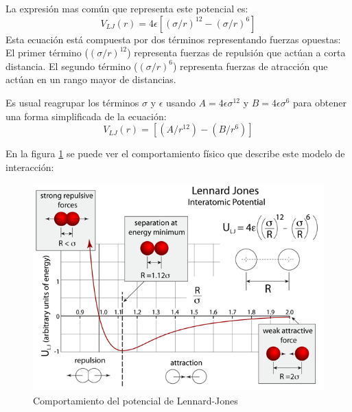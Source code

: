 La expresión mas común que representa este potencial es: 
\begingroup
\fontsize{14pt}{5pt}
\begin{equation} V_{LJ}(r)= 4 \epsilon [ (\sigma/r)^{12} - (\sigma/r)^6] \end{equation}
\endgroup
Esta ecuación está compuesta por dos términos representando fuerzas opuestas:
El primer término ($(\sigma/r)^{12}$) representa fuerzas de repulsión que actúan a corta distancia.
El segundo término ($(\sigma/r)^{6}$) representa fuerzas de atracción que actúan en un rango mayor de distancias.

Es usual reagrupar los términos $\sigma$ y  $\epsilon$ usando  
$A=4\epsilon\sigma^{12}  $  y  $B=4\epsilon\sigma^6$ para obtener una forma simplificada de la ecuación:   \begin{equation}  V_{LJ}(r)= [ (A/r^{12}) - (B/r^6)] \end{equation}



En la figura \ref{lennardimage} se puede ver el comportamiento físico que describe este modelo de interacción:



\begin{figure}[!ht]
\centering
\includegraphics[height=8cm,keepaspectratio, width=\textwidth]{img/LennardJonesFull.png}
\caption{Comportamiento del potencial de Lennard-Jones}
\label{lennardimage}
\end{figure}

